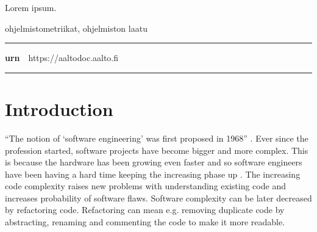 \begin{spacing}{1.05}

\vspace{.8mm}

{\small
  Lorem ipsum.
}

\vfill

\end{spacing}
\begin{spacing}{.88}
{\parindent0pt %

\parbox[t]{121.6mm}{\raggedright\small ohjelmistometriikat, ohjelmiston laatu}

\vspace{.5mm}\rule{\textwidth}{.75pt}

{\fontsize{10.5pt}{10.5pt}\bfseries\sffamily\lsstyle urn}~~{\small https://aaltodoc.aalto.fi}

\vspace{-2.4mm}\rule{\textwidth}{.75pt}

} %
\end{spacing}

\restoregeometry  %




\newpage

\tableofcontents


\newpage



\chapter{Introduction}

“The notion of ‘software engineering’ was first proposed in 1968” \cite{sommerville2011software}. Ever since the profession started, software projects have become bigger and more complex. This is because the hardware has been growing even faster and so software engineers have been having a hard time keeping the increasing phase up \cite{brooks1987no}. The increasing code complexity raises new problems with understanding existing code and increases probability of software flaws. Software complexity can be later decreased by refactoring code. Refactoring can mean e.g. removing duplicate code by abstracting, renaming and commenting the code to make it more readable.

